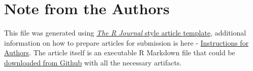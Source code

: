 

\hypertarget{note-from-the-authors}{%
\section{Note from the Authors}\label{note-from-the-authors}}

This file was generated using
\href{https://github.com/rstudio/rticles}{\emph{The R Journal} style
article template}, additional information on how to prepare articles for
submission is here -
\href{https://journal.r-project.org/share/author-guide.pdf}{Instructions
for Authors}. The article itself is an executable R Markdown file that
could be
\href{https://github.com/ivbsoftware/big-data-final-2/blob/master/docs/R_Journal/big-data-final-2/}{downloaded
from Github} with all the necessary artifacts.


\address{%
Vadim Spirkov\\
York University School of Continuing Studies\\
\\
}


\address{%
Murlidhar Loka\\
York University School of Continuing Studies\\
\\
}


